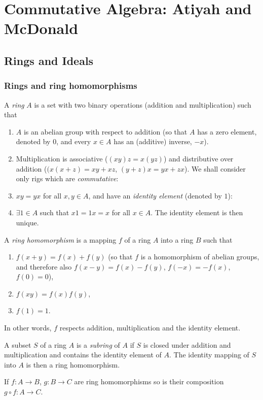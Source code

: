 \chapter{Commutative Algebra: Atiyah and McDonald}
\section{Rings and Ideals}
\subsection{Rings and ring homomorphisms}
A \emph{ring} $A$ is a set with two binary operations (addition
and multiplication) such that
\begin{enumerate}[noitemsep,label=(\arabic*)]
\item $A$ is an abelian group with respect to addition (so that
  $A$ has a zero element, denoted by $0$, and every $x\in A$ has
  an (additive) inverse, $-x$).
\item Multiplication is associative ($(xy)z=x(yz)$) and
  distributive over addition ($(x(x+z)=xy+xz$,
  $(y+z)x=yx+zx$). We shall consider only rigs which are
  \emph{commutative}:
\item $xy=yx$ for all $x,y\in A$, and have an \emph{identity
    element} (denoted by $1$):
\item $\exists 1\in A$ such that $x1=1x=x$ for all $x\in A$. The
  identity element is then unique.
\end{enumerate}

A \emph{ring homomorphism} is a mapping $f$ of a ring $A$
into a ring $B$ such that
\begin{enumerate}[noitemsep,label=(\roman*)]
\item $f(x+y)=f(x)+f(y)$ (so that $f$ is a homomorphism of
  abelian groups, and therefore also $f(x-y)=f(x)-f(y)$,
  $f(-x)=-f(x)$, $f(0)=0$),
\item $f(xy)=f(x)f(y)$,
\item $f(1)=1$.
\end{enumerate}
In other words, $f$ respects addition, multiplication and the
identity element.

A subset $S$ of a ring $A$ is a \emph{subring} of $A$ if $S$ is
closed under addition and multiplication and contains the
identity element of $A$. The identity mapping of $S$ into $A$ is
then a ring homomorphism.

If $f\colon A\to B$, $g\colon B\to C$ are ring homomorphisms so
is their composition $g\circ f\colon A\to C$.
